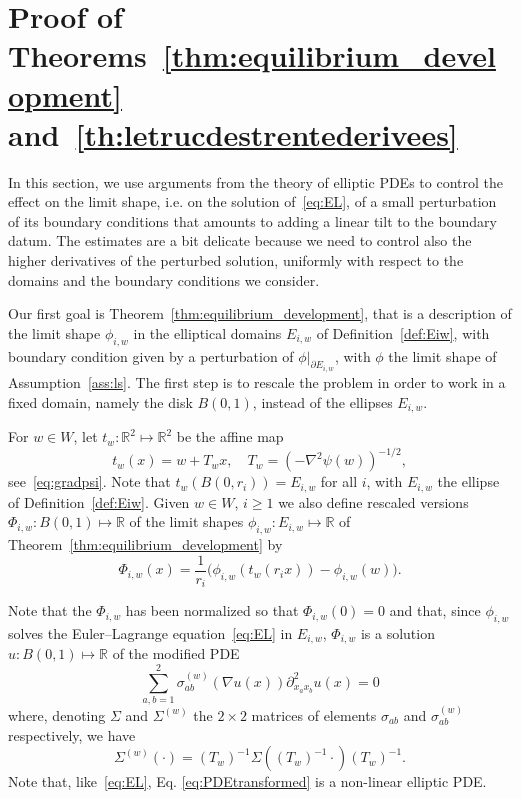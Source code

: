 \documentclass[AHL,Unicode,longabstracts,published]{cedram}
\newcommand{\R}{\mathbb{R}}
\begin{document}
\section{Proof of Theorems~\ref{thm:equilibrium_development} and~\ref{th:letrucdestrentederivees}}\label{sec:perturbation_continuum}

In this section, we use arguments from the theory of elliptic PDEs to control the effect on the limit shape, i.e. on the solution of~\eqref{eq:EL}, of a small perturbation of its boundary conditions that amounts to adding a linear tilt to the boundary datum. The estimates are a bit delicate because we need to control also the higher derivatives of the perturbed solution, uniformly with respect to the domains and the boundary conditions we consider.


Our first goal is Theorem~\ref{thm:equilibrium_development}, that is a description of the limit shape $\phi_{i,w}$ in the elliptical domains $E_{i,w}$ of Definition~\ref{def:Eiw}, with boundary condition given by a perturbation of $\phi|_{\partial E_{i,w}}$, with $\phi$ the limit shape of Assumption~\ref{ass:ls}. The first step is to rescale the problem in order to work in a fixed domain, namely the disk $B(0,1)$, instead of the ellipses $E_{i,w}$.
\begin{defi}
For $w \in W$, let $t_w:\R^2\mapsto \R^2$ be the affine map
\begin{equation}\label{eq:tw}
t_w(x)=w+T_w x, \quad T_w=\left(-\nabla^2\psi(w)\right)^{-1/2},
\end{equation}
see~\eqref{eq:gradpsi}. Note that $t_w(B(0, r_i)) = E_{i,w}$ for all $i$, with $E_{i,w}$ the ellipse of Definition~\ref{def:Eiw}. Given $w\in W$, $i\ge1$ we also define rescaled versions $\Phi_{i,w}:B(0, 1)\mapsto \R$ of the limit shapes $\phi_{i,w}:E_{i,w}\mapsto \R$ of Theorem~\ref{thm:equilibrium_development} by
\begin{equation}\label{eq:PhiIW}
\Phi_{i,w}(x) = \frac{1}{r_i}\big(\phi_{i,w}(t_w(r_i x)) - \phi_{i,w}(w)\big).
\end{equation}
\end{defi}

Note that the $\Phi_{i,w}$ has been normalized so that $\Phi_{i,w}(0)=0$ and that, since $\phi_{i,w}$ solves the Euler--Lagrange equation~\eqref{eq:EL} in $E_{i,w}$, $\Phi_{i,w}$ is a solution $u:B(0,1)\mapsto \R$ of the modified PDE
\begin{equation}\label{eq:PDEtransformed}
\sum_{a,b=1}^2\sigma^{(w)}_{ab}(\nabla u(x))\partial^2_{x_a x_b}u(x)=0
\end{equation}
where, denoting $\Sigma$ and $\Sigma^{(w)}$ the $2\times 2$ matrices of elements $\sigma_{ab}$ and $\sigma^{(w)}_{ab}$ respectively, we have
\begin{equation}\label{eq:sS}
\Sigma^{(w)}(\cdot)=(T_w)^{-1} \Sigma\left((T_w)^{-1}\cdot\right)(T_w)^{-1}.
\end{equation}
Note that, like~\eqref{eq:EL}, Eq. \eqref{eq:PDEtransformed} is a non-linear elliptic PDE.
\end{document}
